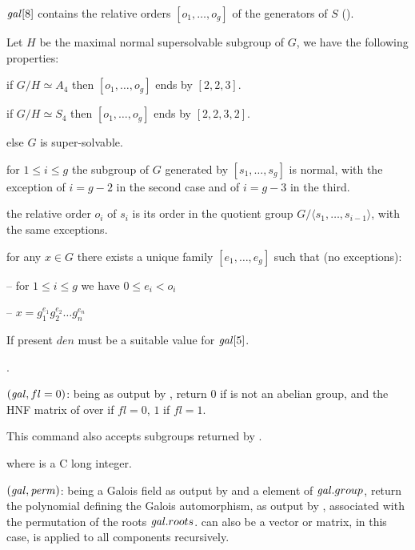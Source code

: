  $\hbox{\it gal\/}[8]$ contains the relative orders $[o_1,\ldots,o_g]$ of
 the generators of $S$ ().

Let $H$ be the maximal normal supersolvable subgroup of $G$, we have the
following properties:

\quad\item if $G/H\simeq A_4$ then $[o_1,\ldots,o_g]$ ends by
$[2,2,3]$.

\quad\item if $G/H\simeq S_4$ then $[o_1,\ldots,o_g]$ ends by
$[2,2,3,2]$.

\quad\item else $G$ is super-solvable.

\quad\item for $1\leq i \leq g$ the subgroup of $G$ generated by
$[s_1,\ldots,s_g]$ is normal, with the exception of $i=g-2$ in the
second case and of $i=g-3$ in the third.

\quad\item the relative order $o_i$ of $s_i$ is its order in the
quotient group $G/\langle s_1,\ldots,s_{i-1}\rangle$, with the same
exceptions.

\quad\item for any $x\in G$ there exists a unique family
$[e_1,\ldots,e_g]$ such that (no exceptions):

-- for $1\leq i \leq g$ we have $0\leq e_i<o_i$

-- $x=g_1^{e_1}g_2^{e_2}\ldots g_n^{e_n}$

If present $den$ must be a suitable value for $\hbox{\it gal\/}[5]$.

.

$(\hbox{\it gal\/},{fl=0})$:  being as output by , return $0$ if
  is not an abelian group, and the HNF matrix of  over  if $fl=0$, $1$ if
 $fl=1$.

This command also accepts subgroups returned by .

 where  is a C long integer.

$(\hbox{\it gal\/},\hbox{\it perm\/})$:  being a
Galois field as output by  and  a element of
$\hbox{\it gal\/}.group$, return the polynomial defining the Galois
automorphism, as output by , associated with the
permutation  of the roots $\hbox{\it gal\/}.roots$.  can
also be a vector or matrix, in this case,  is
applied to all components recursively.

